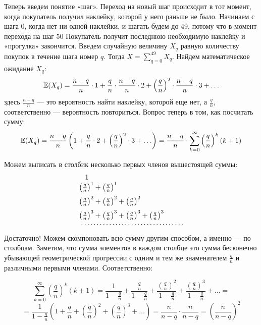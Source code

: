 \documentclass[12pt, a4paper]{article}\usepackage[]{graphicx}\usepackage[]{color}
\begin{document}
\begin{enumerate}
Теперь введем понятие «шаг». Переход на новый шаг происходит в тот момент, когда покупатель получил наклейку, которой у него раньше не было. Начинаем с шага 0, когда нет ни одной наклейки, и шагать будем до 49, потому что в момент перехода на шаг 50 Покупатель получит последнюю необходимую наклейку и «прогулка» закончится. Введем случайную величину $X_q$ равную количеству покупок в течение шага номер $q$. Тогда $X = \sum \limits_{q=0}^{49}X_q$.  Найдем математическое ожидание $X_q$:
\[
\mathbb{E}(X_q) = \frac{n-q}{n}\cdot 1 + \frac{q}{n}\cdot\frac{n-q}{n}\cdot 2 + \left(\frac{q}{n}\right)^2\cdot\frac{n-q}{n}\cdot 3 + \ldots
\]
здесь $\frac{n-q}{n}$ —  это вероятность найти наклейку, которой еще нет, а $\frac{q}{n}$, соответственно — вероятность повториться. Вопрос теперь в том, как посчитать сумму:
\[
\mathbb{E}(X_q) = \frac{n-q}{n}\left( 1 + \frac{q}{n}\cdot 2 + \left(\frac{q}{n}\right)^2 \cdot 3 + \ldots\right) = \frac{n-q}{n}\cdot\sum\limits_{k=0}^{\infty}\left(\frac{q}{n}\right)^k(k+1)
\]

Можем выписать в столбик несколько первых членов вышестоящей суммы:
\[
\begin{array}{l}
\hspace{0.3cm}1 \\
\vspace{0.2cm}
\left(\frac{q}{n}\right)^1  + \left(\frac{q}{n}\right)^1  \\
\vspace{0.2cm}
\left(\frac{q}{n}\right)^2 + \left(\frac{q}{n}\right)^2  + \left(\frac{q}{n}\right)^2 \\
\left(\frac{q}{n}\right)^3 + \left(\frac{q}{n}\right)^3 + \left(\frac{q}{n}\right)^3 + \left(\frac{q}{n}\right)^3 \\
\hspace{0.1cm}\cdots\cdots\cdots\cdots\cdots\cdots\cdots\cdots\cdots\cdots\cdots
\end{array}
\]
Достаточно! Можем скомпоновать всю сумму другим способом, а именно — по столбцам. Заметим, что сумма элементов в каждом столбце это сумма бесконечно убывающей геометрической прогрессии с одним и тем же знаменателем $\frac{q}{n}$ и различными первыми членами. Соответственно:

\[
\sum\limits_{k=0}^{\infty}\left(\frac{q}{n}\right)^k(k+1) = \frac{1}{1-\frac{q}{n}} + \frac{\frac{q}{n}}{1-\frac{q}{n}} + \frac{\left(\frac{q}{n}\right)^2}{1-\frac{q}{n}} + \frac{\left(\frac{q}{n}\right)^3}{1-\frac{q}{n}} + \dots =
\]
\[
= \frac{1}{1-\frac{q}{n}}\left( 1 + \frac{q}{n} + \left(\frac{q}{n}\right)^2 + \left(\frac{q}{n}\right)^3 + \dots\right) = \frac{n}{n-q}\cdot\frac{n}{n-q} = \left( \frac{n}{n-q}\right)^2
\]


\end{enumerate}
\end{document}
